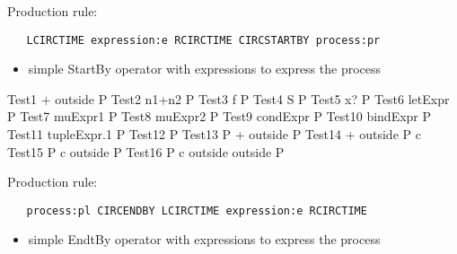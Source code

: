 \documentclass{article}
\begin{document}
\newpage

Production rule:
\begin{verbatim}
   LCIRCTIME expression:e RCIRCTIME CIRCSTARTBY process:pr
\end{verbatim}

\begin{itemize}
   \item simple StartBy operator with expressions to express the process 
\end{itemize}


\begin{circus}
   \circprocess Test1 \circdef {} + outside \rcirctime \circstartby P
   \also
   \circprocess Test2 \circdef \lcirctime n1+n2 \rcirctime \circstartby P 
   \also
   \circprocess Test3 \circdef \lcirctime f \rcirctime \circstartby P
   \also
   \circprocess Test4 \circdef \lcirctime \theta S \rcirctime \circstartby P
   \also
   \circprocess Test5 \circdef \lcirctime x? \rcirctime \circstartby P
   \also
   \circprocess Test6 \circdef \lcirctime letExpr \rcirctime \circstartby P
   \also
   \circprocess Test7 \circdef \lcirctime muExpr1 \rcirctime \circstartby P
   \also
   \circprocess Test8 \circdef \lcirctime muExpr2 \rcirctime \circstartby P
   \also
   \circprocess Test9 \circdef \lcirctime condExpr \rcirctime \circstartby P
   \also
   \circprocess Test10 \circdef \lcirctime bindExpr \rcirctime \circstartby P
   \also
   \circprocess Test11 \circdef \lcirctime tupleExpr.1 \rcirctime \circstartby P
   \also
   \circprocess Test12 \circdef {}   \rcirctime \circstartby P
   \also
   \circprocess Test13 \circdef  P \circseq {} + outside \rcirctime \circstartby P
   \also
   \circprocess Test14 \circdef  {} + outside \rcirctime \circstartby P \circhide   
   \lchanset c \rchanset
   \also
   \circprocess Test15 \circdef  P \lpar \lchanset c \rchanset \rpar \lcirctime outside    
   \rcirctime \circstartby P
   \also
   \circprocess Test16 \circdef  P \lpar \lchanset c \rchanset \rpar \lcirctime outside    
   \rcirctime \circstartby \lcirctime outside \rcirctime \circstartby P
\end{circus}

Production rule:
\begin{verbatim}
   process:pl CIRCENDBY LCIRCTIME expression:e RCIRCTIME
\end{verbatim}

\begin{itemize}
   \item simple EndtBy operator with expressions to express the process 
\end{itemize}
\end{document}

